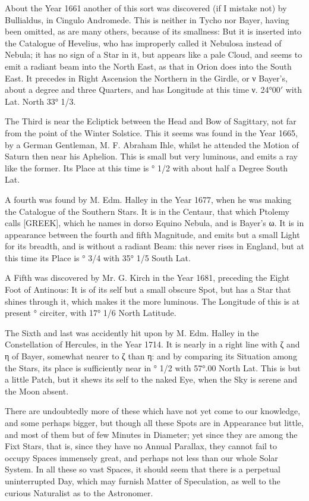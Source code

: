 \documentclass[a4paper, 12pt, oneside, polutonikogreek, english]{article}
\begin{document}
About the Year 1661 another of this sort was discovered (if I mistake not) by Bullialdus, in Cingulo Andromede. This is neither in Tycho nor Bayer, having been omitted, as are many others, because of its smallness: But it is inserted into the Catalogue of Hevelius, who has improperly called it Nebulosa instead of Nebula; it has no sign of a Star in it, but appears like a pale Cloud, and seems to emit a radiant beam into the North East, as that in Orion does into the South East. It precedes in Right Ascension the Northern in the Girdle, or ν Bayer's, about a degree and three Quarters, and has Longitude at this time ν. 24°00$\prime$ with Lat. North 33° 1/3.

The Third is near the Ecliptick between the Head and Bow of Sagittary, not far from the point of the Winter Solstice. This it seems was found in the Year 1665, by a German Gentleman, M. F. Abraham Ihle, whilst he attended the Motion of Saturn then near his Aphelion. This is small but very luminous, and emits a ray like the former. Its Place at this time is ° 1/2 with about half a Degree South Lat.

A fourth was found by M. Edm. Halley in the Year 1677, when he was making the Catalogue of the Southern Stars. It is in the Centaur, that which Ptolemy calls [GREEK], which he names in dorso Equino Nebula, and is Bayer's ω. It is in appearance between the fourth and fifth Magnitude, and emits but a small Light for its breadth, and is without a radiant Beam: this never rises in England, but at this time its Place is ° 3/4 with 35° 1/5 South Lat.

A Fifth was discovered by Mr. G. Kirch in the Year 1681, preceding the Eight Foot of Antinous: It is of its self but a small obscure Spot, but has a Star that shines through it, which makes it the more luminous. The Longitude of this is at present ° circiter, with 17° 1/6 North Latitude.

The Sixth and last was accidently hit upon by M. Edm. Halley in the Constellation of Hercules, in the Year 1714. It is nearly in a right line with ζ and η of Bayer, somewhat nearer to ζ than η: and by comparing its Situation among the Stars, its place is sufficiently near in ° 1/2 with 57°.00 North Lat. This is but a little Patch, but it shews its self to the naked Eye, when the Sky is serene and the Moon absent.

There are undoubtedly more of these which have not yet come to our knowledge, and some perhaps bigger, but though all these Spots are in Appearance but little, and most of them but of few Minutes in Diameter; yet since they are among the Fixt Stars, that is, since they have no Annual Parallax, they cannot fail to occupy Spaces immensely great, and perhaps not less than our whole Solar System. In all these so vast Spaces, it should seem that there is a perpetual uninterrupted Day, which may furnish Matter of Speculation, as well to the curious Naturalist as to the Astronomer.
\end{document}
